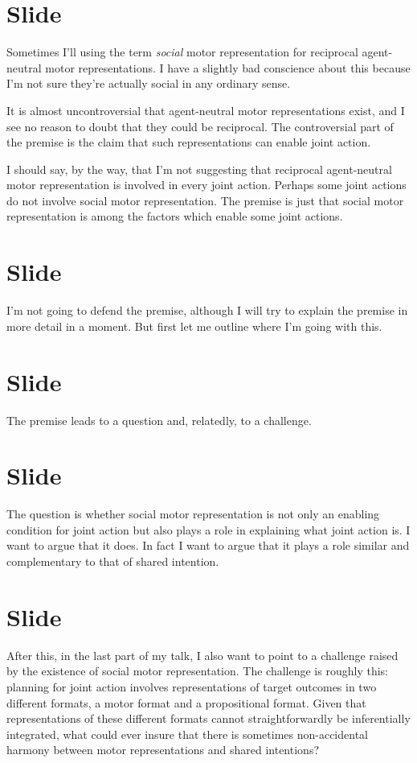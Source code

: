 \documentclass[12pt,\papersize]{extarticle}
\begin{document}
\section{Slide}
Sometimes I’ll using the term \emph{social} motor representation for reciprocal agent-neutral motor representations.
I have a slightly bad conscience about this because I’m not sure they’re actually social in any ordinary sense.

It is almost uncontroversial that agent-neutral motor representations exist, and I see no reason to doubt that they could be reciprocal.
The controversial part of the premise is the claim that such representations can enable joint action.

I should say, by the way, that I’m not suggesting that reciprocal agent-neutral motor representation is involved in every joint action.
Perhaps some joint actions do not involve social motor representation.
The premise is just that social motor representation is among the factors which enable some joint actions.



\section{Slide}
I’m not going to defend the premise, although I will try to explain the premise in more detail in a moment.  But first let me outline where I’m going with this.



\section{Slide}
The premise leads to a question and, relatedly, to a challenge.  



\section{Slide}
The question is whether social motor representation is not only an enabling condition for joint action but also plays a role in explaining what joint action is. I want to argue that it does.  In fact I want to argue that it plays a role similar and complementary to that of shared intention.



\section{Slide}
After this, in the last part of my talk, I also want to point to a challenge raised by the existence of social motor representation.  The challenge is roughly this: planning for joint action involves representations of target outcomes in two different formats, a motor format and a propositional format.  Given that representations of these different formats cannot straightforwardly be inferentially integrated, what could ever insure that there is sometimes non-accidental harmony between motor representations and shared intentions?
\end{document}
